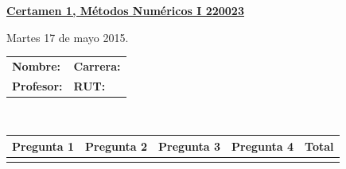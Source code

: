 \documentclass[11pt]{article}
\begin{document}
\hspace*{-1,5cm}

\vspace*{0.5cm} \centerline {\bf\underline{Certamen 1, M\'etodos Num\'ericos I 220023 }}
\centerline{\textrm{Martes 17 de mayo 2015.}}  \vspace{0.2cm}


\begin{center}
 \begin{tabular}{p{}p{}}
	\textbf{Nombre:}   &\textbf{Carrera:}\\
	\textbf{Profesor:} & \textbf{ RUT:}
 \end{tabular}
 \\
 \vspace{0.2cm}
 \begin{tabular}{||p{2cm}|p{2cm}|p{2cm}|p{2cm}||p{2cm}||}
 \hline
 Pregunta 1 &  Pregunta 2  &	Pregunta 3  & 	Pregunta 4  &      Total\\
 \hline
 \vspace{1.5cm} & & & &    \\
 \hline
 \end{tabular}
 \end{center}
\end{document}
